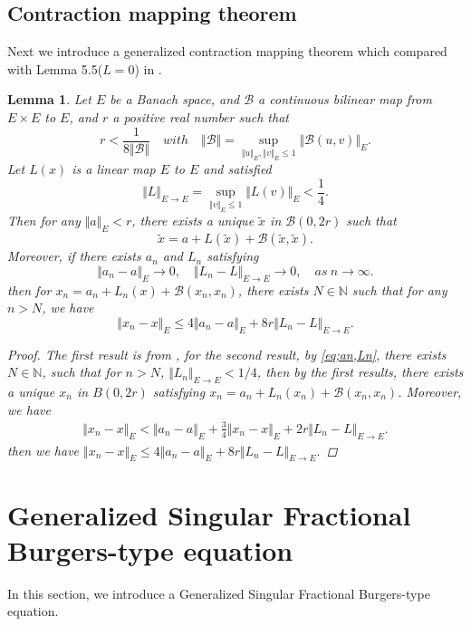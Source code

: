 \documentclass{article}
\newtheorem{lemma}{Lemma}[section]
\numberwithin{equation}{section}
\newcommand{\m}{\mathbb}
\newcommand{\ml}{\mathcal}
\begin{document}
\subsection{Contraction mapping theorem}
Next we introduce a generalized contraction mapping theorem which compared with Lemma 5.5($ L=0$) in \cite{bahouri2011fourier}.
\begin{lemma}\label{le;Picard th}\label{le;continuous dependence}
	Let $E$ be a Banach space, and $\ml B$ a continuous bilinear map from $E\times E$ to $E$, and $r$ a positive real number such that
	$$r<\frac{1}{8\Vert \ml B\Vert}\quad with \quad\Vert \ml B\Vert=\sup_{\Vert u\Vert_E,\Vert v\Vert_E\leq1}\Vert \ml B(u,v)\Vert_E.$$ 
	Let $ L (x)$ is a linear map $E$ to $E$ and satisfied 
    \begin{equation}\label{eq;condition L}
     \Vert L\Vert_{E\to E}=\sup_{\Vert v\Vert_E\leq 1}\Vert L(v)\Vert_E<\frac{1}{4}.
    \end{equation}
	Then for any $\Vert a\Vert_E<r$, there exists a unique $\tilde x$ in $\ml B(0,2r)$ such that 
	$$\tilde x=a+ L(\tilde x)+\ml B(\tilde x,\tilde x).$$
    Moreover, if there exists $a_n$ and $L_n$ satisfying
       \begin{equation}\label{eq;an,Ln}
        \Vert a_n-a\Vert_E\to 0,\quad \Vert L_n-L\Vert_{E\to E}\to0,\quad as\: n\to \infty.
    \end{equation}
    then for $x_n=a_n+L_n(x)+\ml B(x_n,x_n)$, there exists $N\in \m N$ such that for any $n>N$, we have
    \begin{equation}
        \Vert x_n-x\Vert_E\leq 4\Vert a_n-a\Vert_E+8r\Vert L_n-L\Vert_{E\to E}.
    \end{equation}
    \begin{proof}
        The first result is from \cite{zhang2025resultsfractionalroughburgers}, for the second result, by \eqref{eq;an,Ln}, there exists $N\in\m N$, such that for $n>N$, $\Vert L_n\Vert_{E\to E}<1/4$, then by the first results, there exists a unique $x_n$ in $B(0,2r)$ satisfying $x_n=a_n+L_{n}(x_n)+\ml B(x_n,x_n)$. Moreover, we have
       \begin{align*}
            \Vert x_n-x\Vert_E< \Vert a_n-a\Vert_E+\frac{3}{4}\Vert x_n-x\Vert_E+2r\Vert L_n-L\Vert_{E\to E}.
        \end{align*}
        then we have $\Vert x_n-x\Vert_E\leq 4\Vert a_n-a\Vert_E+8r\Vert L_n-L\Vert_{E\to E}.$
    \end{proof}
\end{lemma}
\section{Generalized Singular Fractional Burgers-type equation}\label{sec;GSFB}
\par In this section, we introduce a Generalized  Singular Fractional Burgers-type equation. 
\end{document}
